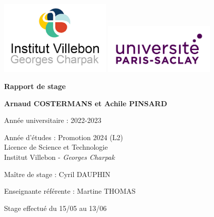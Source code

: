 \documentclass[12pt]{article}
\begin{document}
\begin{titlepage}
    \centering
    
    \includegraphics[width=0.4\textwidth]{Logo/logo_institut.jpeg} \includegraphics[width=0.4\textwidth]{Logo/UPSaclay.jpg}

    \vspace{2cm}
    {\LARGE\textbf{Rapport de stage}\par}
    
    \vspace{2cm}
    {\large\textbf{Arnaud COSTERMANS et Achile PINSARD}\par}
    
    \vspace{0.5cm}
    Année universitaire : 2022-2023
    
    \vspace{0.5cm}
    Année d'études : Promotion 2024 (L2) \\
    Licence de Science et Technologie \\
    Institut Villebon - \textit{Georges Charpak}
    
    
    \vspace{0.5cm}
    Maître de stage : Cyril DAUPHIN
    
    \vspace{0.5cm}
    Enseignante référente : Martine THOMAS
    
    \vspace{0.5cm}
    Stage effectué du 15/05 au 13/06 
\end{titlepage}
\end{document}
